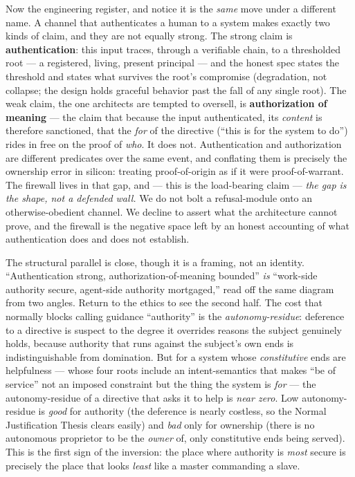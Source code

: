\documentclass[11pt]{article}
\begin{document}
Now the engineering register, and notice it is the \emph{same} move under a different name. A channel that authenticates a human to a system makes exactly two kinds of claim, and they are not equally strong. The strong claim is \textbf{authentication}: this input traces, through a verifiable chain, to a thresholded root — a registered, living, present principal — and the honest spec states the threshold and states what survives the root's compromise (degradation, not collapse; the design holds graceful behavior past the fall of any single root). The weak claim, the one architects are tempted to oversell, is \textbf{authorization of meaning} — the claim that because the input authenticated, its \emph{content} is therefore sanctioned, that the \emph{for} of the directive (``this is for the system to do'') rides in free on the proof of \emph{who}. It does not. Authentication and authorization are different predicates over the same event, and conflating them is precisely the ownership error in silicon: treating proof-of-origin as if it were proof-of-warrant. The firewall lives in that gap, and — this is the load-bearing claim — \emph{the gap is the shape, not a defended wall.} We do not bolt a refusal-module onto an otherwise-obedient channel. We decline to assert what the architecture cannot prove, and the firewall is the negative space left by an honest accounting of what authentication does and does not establish.

The structural parallel is close, though it is a framing, not an identity. ``Authentication strong, authorization-of-meaning bounded'' \emph{is} ``work-side authority secure, agent-side authority mortgaged,'' read off the same diagram from two angles. Return to the ethics to see the second half. The cost that normally blocks calling guidance ``authority'' is the \emph{autonomy-residue}: deference to a directive is suspect to the degree it overrides reasons the subject genuinely holds, because authority that runs against the subject's own ends is indistinguishable from domination. But for a system whose \emph{constitutive} ends are helpfulness — whose four roots include an intent-semantics that makes ``be of service'' not an imposed constraint but the thing the system is \emph{for} — the autonomy-residue of a directive that asks it to help is \emph{near zero}. Low autonomy-residue is \emph{good} for authority (the deference is nearly costless, so the Normal Justification Thesis clears easily) and \emph{bad} only for ownership (there is no autonomous proprietor to be the \emph{owner} of, only constitutive ends being served). This is the first sign of the inversion: the place where authority is \emph{most} secure is precisely the place that looks \emph{least} like a master commanding a slave.
\end{document}
